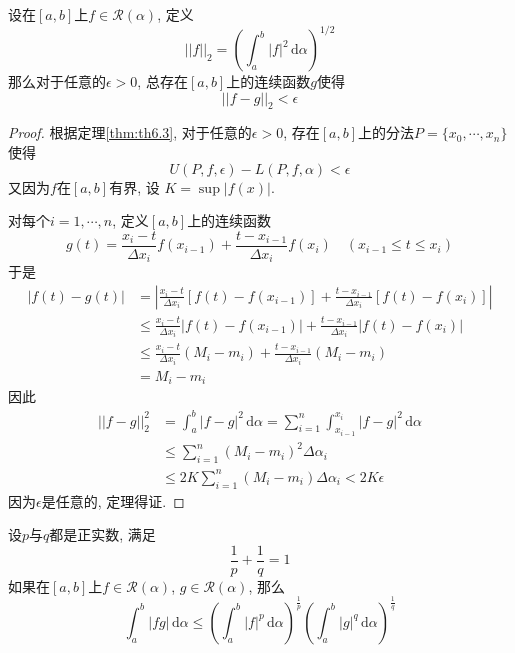 \documentclass[cn,12pt,math=mtpro2,citestyle=gb7714-2015,bibstyle=gb7714-2015,twocol]{elegantbook}
\newcommand{\da}{\,\text{d}\alpha}
\newcommand{\RR}{\mathscr{R}}
\begin{document}
\begin{theorem}\label{thm:th6.13}
  设在$[a,b]$上$f\in\mathscr{R}(\alpha)$, 定义
  $$||f||_2=\left(\int_{a}^{b}|f|^2\da\right)^{1/2}$$
  那么对于任意的$\epsilon>0$, 总存在$[a,b]$上的连续函数$g$使得
  $$||f-g||_2<\epsilon$$
\end{theorem}
\begin{proof}
  根据定理\ref{thm:th6.3}, 对于任意的$\epsilon>0$, 存在$[a,b]$上的分法$P=\{x_0,\cdots,x_n\}$使得
  $$U(P,f,\epsilon)-L(P,f,\alpha)<\epsilon$$
  又因为$f$在$[a,b]$有界, 设
  $\displaystyle K=\sup |f(x)|$.

  对每个$i=1,\cdots,n$, 定义$[a,b]$上的连续函数
  $$g(t)=\frac{x_i-t}{\Delta x_i}f(x_{i-1})+\frac{t-x_{i-1}}{\Delta x_i}f(x_i) \quad (x_{i-1}\leq t\leq x_i)$$
  于是
  \begin{align*}
  |f(t)-g(t)|&=\left|\frac{x_i-t}{\Delta x_i}[f(t)-f(x_{i-1})]+\frac{t-x_{i-1}}{\Delta x_{i}}[f(t)-f(x_{i})] \right| \\
  &\leq \frac{x_i-t}{\Delta x_i}|f(t)-f(x_{i-1})|+\frac{t-x_{i-1}}{\Delta x_{i}}|f(t)-f(x_i)| \\
  &\leq \frac{x_i-t}{\Delta x_i}(M_i-m_i)+\frac{t-x_{i-1}}{\Delta x_i}(M_i-m_i)\\
  &=M_i-m_i
  \end{align*}
  因此
  \begin{align*}
  ||f-g||_2^2&=\int_{a}^{b}|f-g|^2\da=\sum_{i=1}^{n}\int_{x_{i-1}}^{x_i}|f-g|^2\da \\
  &\leq \sum_{i=1}^{n}(M_i-m_i)^2\Delta\alpha_i \\
  &\leq 2K\sum_{i=1}^{n}(M_i-m_i)\Delta\alpha_i<2K\epsilon
  \end{align*}
  因为$\epsilon$是任意的, 定理得证.

\end{proof}
\begin{theorem}[Hölder不等式]
  设$p$与$q$都是正实数, 满足
  \begin{equation}\label{eq6.27}
    \frac{1}{p}+\frac{1}{q}=1
  \end{equation}
  如果在$[a,b]$上$f\in\RR(\alpha)$, $g\in\RR(\alpha)$, 那么
  \begin{equation}\label{eq6.28}
     \int_{a}^{b}\left|fg\right|\da\leq\left(\int_{a}^{b}|f|^p\da\right)^{\frac{1}{p}}\left(\int_{a}^{b}|g|^q\da\right)^{\frac{1}{q}}
  \end{equation}
\end{theorem}
\end{document}

